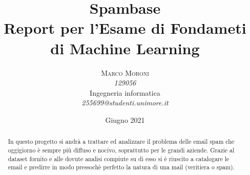 \documentclass[12pt,a4paper]{article}
\begin{document}
\title{Spambase \\
\Large{Report per l'Esame di Fondameti di Machine Learning}
} %

\author{\textsc{Marco Moroni} \\
    \emph{129056} \\
    Ingegneria informatica\\
    \emph{255699@studenti.unimore.it}
  }

\date{Giugno 2021}

\maketitle
\clearpage
\begin{abstract}
\normalsize
In questo progetto si andrà a trattare ed analizzare il problema delle email spam che oggigiorno è sempre più diffuso e nocivo, soprattutto per le grandi aziende. Grazie al dataset fornito e alle dovute analisi compiute su di esso si è riuscito a catalogare le email e predirre in modo pressochè perfetto la natura di una mail (veritiera o spam).
\end{abstract}

\clearpage
\end{document}
